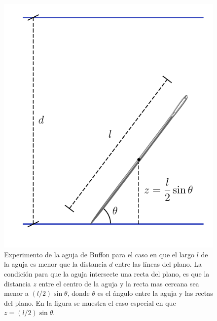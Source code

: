 \documentclass[a4paper]{report}
\begin{document}
\begin{figure}[!htb]
  \begin{minipage}[c]{0.45\textwidth}
    \includegraphics[width=\textwidth]{figuras/buffon_needle_short.pdf}
  \end{minipage}\hfill
  \begin{minipage}[c]{0.45\textwidth}
    \caption{
       Experimento de la aguja de Buffon para el caso en que el largo \(l\) de la aguja es menor que la distancia \(d\) entre las líneas del plano. La condición para que la aguja intersecte una recta del plano, es que la distancia \(z\) entre el centro de la aguja y la recta mas cercana sea menor a \((l/2)\sin\theta\), donde \(\theta\) es el ángulo entre la aguja y las rectas del plano. En la figura se muestra el caso especial en que \(z=(l/2)\sin\theta\).
    } \label{fig:buffon_needle_short}
  \end{minipage}
\end{figure}
\end{document}
